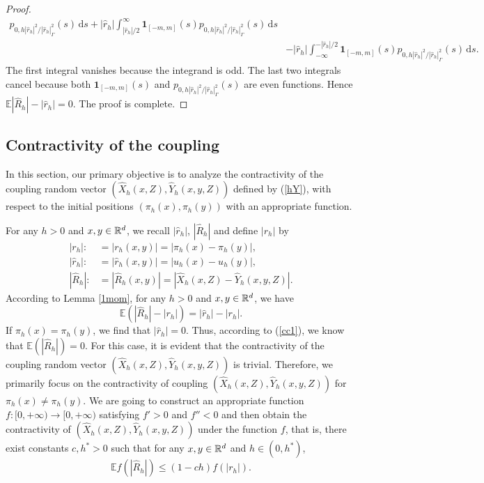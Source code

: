 \documentclass[aap]{imsart}
\theoremstyle{plain}
\theoremstyle{definition}
\begin{document}
\begin{proof}
\[\begin{aligned}
		p_{0,h|\hat r_h|^2/|\hat r_h|_\Gamma^2}(s)
		\,\mathrm ds+
		|\hat r_h|
		\int_{|\hat r_h|/2}^{\infty}
		\mathbf 1_{[-m,m]}(s)
		p_{0,h|\hat r_h|^2/|\hat r_h|_\Gamma^2}(s)
		\,\mathrm ds                                     \\
		&-
		|\hat r_h|
		\int_{-\infty}^{-|\hat r_h|/2}
		\mathbf 1_{[-m,m]}(s)
		p_{0,h|\hat r_h|^2/|\hat r_h|_\Gamma^2}(s)
		\,\mathrm ds .
	\end{aligned}
	\]
	The first integral vanishes because the integrand is odd. The last two
	integrals cancel because both \(\mathbf 1_{[-m,m]}(s)\) and \(p_{0,h|\hat r_h|^2/|\hat r_h|_\Gamma^2}(s)\) are even functions. Hence \(\mathbb E|\hat{R}_h|
	-|\hat r_h| = 0\). The proof is complete.
\end{proof}
			
			\subsection{Contractivity of the coupling}\label{Sec4.3}
			In this section, our primary objective is to analyze the contractivity of the coupling random vector $(\hat{X}_h(x,Z), \hat{Y}_h(x, y,Z))$ defined by (\ref{hY}), with respect to the initial positions $(\pi_h(x), \pi_h(y))$ with an appropriate function.
			
			For any $h>0$ and  $x, y\in\mathbb{R}^d$, we recall $|\hat{r}_h|$, $|\hat{R}_h|$ and define $|r_h|$ by
			\begin{subequations}\label{eq3}
				\begin{align}
					|r_h|: &= |r_h(x, y)| = |\pi_h(x)-\pi_h(y)|,  \label{Nata}\\
					|\hat{r}_h|: &= |\hat{r}_h(x, y)| = |u_h(x)-u_h(y)|, \label{Natb}\\
					|\hat{R}_h|: &= |\hat{R}_h(x, y)| = |\hat{X}_h(x,Z)-\hat{Y}_h(x, y,Z)|.\label{Natc}
				\end{align}
			\end{subequations}	
			According to Lemma \ref{1mom}, for any $h>0$ and $x, y\in\mathbb{R}^d$, we have
			\begin{equation}\label{cc1}
				\mathbb{E}(|\hat{R}_h| - |r_h|) = |\hat{r}_h| - |r_h|.
			\end{equation}
			If $\pi_h(x) = \pi_h(y)$, we find that $|\hat{r}_h| = 0$. Thus, according to (\ref{cc1}), we know that \(\mathbb{E}(|\hat{R}_h|) = 0\). For this case, it is evident that the contractivity of the coupling random vector $(\hat{X}_h(x, Z), \hat{Y}_h(x, y,Z))$ is trivial. Therefore, we  primarily focus on the contractivity of coupling $(\hat{X}_h(x, Z), \hat{Y}_h(x, y,Z))$ for $\pi_h(x) \neq \pi_h(y)$.  
We are going to construct an appropriate function $f:[0, +\infty) \to [0, +\infty)$ satisfying $f' > 0$ and $f'' < 0$ and then obtain the contractivity of $(\hat{X}_h(x, Z), \hat{Y}_h(x, y,Z))$ under the function $f$, that is, there exist constants $c, h^*>0$ such that for any $x, y\in\mathbb{R}^d$ and $h \in (0, h^*)$,
\begin{equation*}
\mathbb{E}f(|\hat{R}_h|) \leqslant (1 - ch)f(|r_h|).
\end{equation*}
\end{document}
